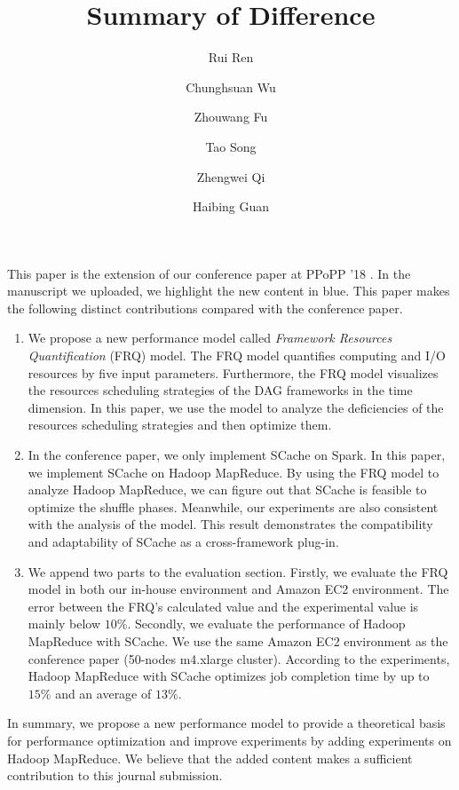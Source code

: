 \documentclass[12pt,reqno]{amsart}
\title{Summary of Difference}
\author{Rui Ren}
\author{Chunghsuan Wu}
\author{Zhouwang Fu}
\author{Tao Song}
\author{Zhengwei Qi}
\author{Haibing Guan}
\theoremstyle{plain}
\numberwithin{equation}{section}
\theoremstyle{plain}
\numberwithin{equation}{section}
\begin{document}
\maketitle



This paper is the extension of our conference paper at PPoPP '18 \cite{fu2018efficient}. 
In the manuscript we uploaded, we highlight the new content in blue.
This paper makes the following distinct contributions compared with the conference paper.

\begin{enumerate}
\item 
We propose a new performance model called \textit{Framework Resources Quantification} (FRQ) model.
The FRQ model quantifies computing and I/O resources by five input parameters. 
Furthermore, the FRQ model visualizes the resources scheduling strategies of the DAG frameworks in the time dimension. 
In this paper, we use the model to analyze the deficiencies of the resources scheduling strategies and then optimize them.
\item 
In the conference paper, we only implement SCache on Spark. 
In this paper, we implement SCache on Hadoop MapReduce. 
By using the FRQ model to analyze Hadoop MapReduce, we can figure out that SCache is feasible to optimize the shuffle phases. 
Meanwhile, our experiments are also consistent with the analysis of the model.
This result demonstrates the compatibility and adaptability of SCache as a cross-framework plug-in.
\item
We append two parts to the evaluation section. 
Firstly, we evaluate the FRQ model in both our in-house environment and Amazon EC2 environment. The error between the FRQ’s calculated value and the experimental value is mainly below $10\%$. 
Secondly, we evaluate the performance of Hadoop MapReduce with SCache. We use the same Amazon EC2 environment as the conference paper (50-nodes m4.xlarge cluster).
According to the experiments, Hadoop MapReduce with SCache optimizes job completion time by up to $15\%$ and an average of $13\%$.
\end{enumerate}

In summary, we propose a new performance model to provide a theoretical basis for performance optimization and improve experiments by adding experiments on Hadoop MapReduce. 
We believe that the added content makes a sufficient contribution to this journal submission.



\end{document}

